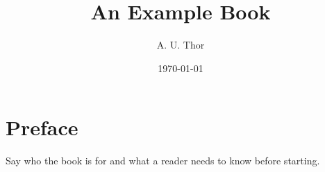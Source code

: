 \documentclass[11pt,a4paper,openright]{book}
\title{An Example Book}
\author{A. U. Thor}
\date{\today}
\begin{document}
\frontmatter
\maketitle
\tableofcontents

\chapter{Preface}
Say who the book is for and what a reader needs to know before starting.

\mainmatter



\backmatter


\end{document}
